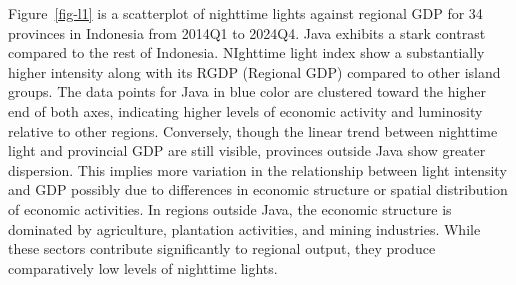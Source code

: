 \documentclass[
  manuscript=article,
  layout=publish,
  year=2026,
  volume=3,
]{den}
\begin{document}
Figure~\ref{fig-l1} is a scatterplot of nighttime lights against
regional GDP for 34 provinces in Indonesia from 2014Q1 to 2024Q4. Java
exhibits a stark contrast compared to the rest of Indonesia. NIghttime
light index show a substantially higher intensity along with its RGDP
(Regional GDP) compared to other island groups. The data points for Java
in blue color are clustered toward the higher end of both axes,
indicating higher levels of economic activity and luminosity relative to
other regions. Conversely, though the linear trend between nighttime
light and provincial GDP are still visible, provinces outside Java show
greater dispersion. This implies more variation in the relationship
between light intensity and GDP possibly due to differences in economic
structure or spatial distribution of economic activities. In regions
outside Java, the economic structure is dominated by agriculture,
plantation activities, and mining industries. While these sectors
contribute significantly to regional output, they produce comparatively
low levels of nighttime lights.
\end{document}
